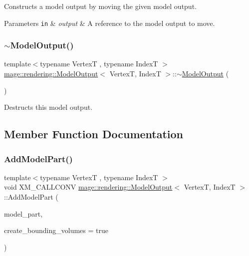 Constructs a model output by moving the given model output.


\begin{DoxyParams}[1]{Parameters}
\mbox{\tt in}  & {\em output} & A reference to the model output to move. \\
\hline
\end{DoxyParams}
\hypertarget{structmage_1_1rendering_1_1_model_output_a627e604ee86986e4d439244ff734c69c}{}\label{structmage_1_1rendering_1_1_model_output_a627e604ee86986e4d439244ff734c69c} 
\subsubsection{\texorpdfstring{$\sim$\+Model\+Output()}{~ModelOutput()}}
{\footnotesize\ttfamily template$<$typename VertexT , typename IndexT $>$ \\
\hyperlink{structmage_1_1rendering_1_1_model_output}{mage\+::rendering\+::\+Model\+Output}$<$ VertexT, IndexT $>$\+::$\sim$\hyperlink{structmage_1_1rendering_1_1_model_output}{Model\+Output} (\begin{DoxyParamCaption}{ }\end{DoxyParamCaption})\hspace{0.3cm}{\ttfamily [default]}}

Destructs this model output. 

\subsection{Member Function Documentation}
\hypertarget{structmage_1_1rendering_1_1_model_output_a33512b10fe669c18051a4eac3444f962}{}\label{structmage_1_1rendering_1_1_model_output_a33512b10fe669c18051a4eac3444f962} 
\subsubsection{\texorpdfstring{Add\+Model\+Part()}{AddModelPart()}}
{\footnotesize\ttfamily template$<$typename VertexT , typename IndexT $>$ \\
void X\+M\+\_\+\+C\+A\+L\+L\+C\+O\+NV \hyperlink{structmage_1_1rendering_1_1_model_output}{mage\+::rendering\+::\+Model\+Output}$<$ VertexT, IndexT $>$\+::Add\+Model\+Part (\begin{DoxyParamCaption}\item[{\hyperlink{structmage_1_1rendering_1_1_model_part}{Model\+Part}}]{model\+\_\+part,  }\item[{bool}]{create\+\_\+bounding\+\_\+volumes = {\ttfamily true} }\end{DoxyParamCaption})}

